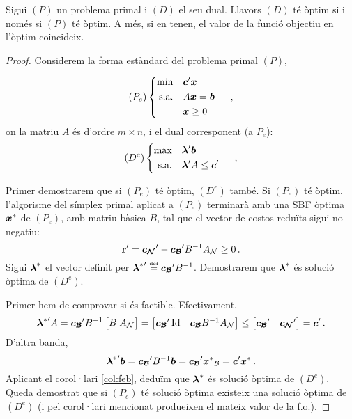 \begin{teo}\label{teo:dualitat-fort}
    Sigui $\left(P\right)$ un problema primal i $\left(D\right)$ el seu dual. Llavors $(D)$ té òptim si i només si $(P)$ té òptim. A més, si en tenen, el valor de la funció objectiu en l'òptim coincideix.
    \begin{proof}
    	Considerem la forma estàndard del problema primal $(P)$,
    	
    	\[
    		(P_e)
    		\begin{cases}
    		\begin{aligned}
			   	\min 			&&& \boldsymbol{c}'\boldsymbol{x}\\
	    		\text{s.a.}		&&& A\boldsymbol{x} = \boldsymbol{b}\\
	    						&&& \boldsymbol{x}\ge0
    		\end{aligned}
    		\end{cases}\ ,
    	\]
    	on la matriu $A$ és d'ordre $m\times n$, i el dual corresponent (a $P_e$):
    	\[
	    	(D^e)
	    	\begin{cases}
	    	\begin{aligned}
	    	\max 			&&& \boldsymbol{\lambda}'\boldsymbol{b}\\
	    	\text{s.a.}		&&& \boldsymbol{\lambda}'A \le \boldsymbol{c}'
	    	\end{aligned}
	    	\end{cases}\ ,
    	\]
    	
    	Primer demostrarem que si $(P_e)$ té òptim, $(D^e)$ també. Si $(P_e)$ té òptim, l'algorisme del símplex primal aplicat a $(P_e)$ terminarà amb una SBF òptima $\boldsymbol{x}^\ast$ de $(P_e)$, amb matriu bàsica $B$, tal que el vector de costos reduïts sigui no negatiu: \[\mathbf{r}' = \boldsymbol{c_{\mathcal{N}}} '- \boldsymbol{c_{\mathcal{B}}}' B^{-1} A_{\mathcal{N}} \ge 0\,.\] Sigui $\boldsymbol{\lambda}^\ast$ el vector definit per ${\boldsymbol{\lambda}^\ast}'\stackrel{\text{\tiny def}}{=} \boldsymbol{c_{\mathcal{B}}}'B^{-1}$. Demostrarem que $\boldsymbol{\lambda}^\ast$ és solució òptima de $(D^e)$.
    	
    	Primer hem de comprovar si és factible. Efectivament, 
    	\[
    		{\boldsymbol{\lambda}^\ast}'A = 
    		\boldsymbol{c_{\mathcal{B}}}' B^{-1}
    		\begin{bmatrix}
		   		B 	\vert 	A_{\mathcal{N}}
    		\end{bmatrix} =
    		\begin{bmatrix}
    			\boldsymbol{c_{\mathcal{B}}}' \operatorname{Id} & \boldsymbol{c_{\mathcal{B}}} B^{-1} A_{\mathcal{N}}    			
    		\end{bmatrix}
    		\le
    		\begin{bmatrix}
	    		\boldsymbol{c_{\mathcal{B}}}' 	&\boldsymbol{c_{\mathcal{N}}}'
    		\end{bmatrix}
    		= \boldsymbol{c}'\,.
    	\]
    	D'altra banda, \[{\boldsymbol{\lambda}^\ast}'\boldsymbol{b} = \boldsymbol{c_{\mathcal{B}}}' B^{-1} \boldsymbol{b} = \boldsymbol{c_{\mathcal{B}}}' {\boldsymbol{x}^\ast}_{\mathcal{B}} = \boldsymbol{c}'{\boldsymbol{x}^\ast}\,. \] Aplicant el corol·lari \ref{col:feb}, deduïm que $\boldsymbol{\lambda}^\ast$ és solució òptima de $(D^e)$. Queda demostrat que si $(P_e)$ té solució òptima existeix una solució òptima de $(D^e)$ (i pel corol·lari mencionat produeixen el mateix valor de la f.o.).
    	

\end{proof}
\end{teo}
